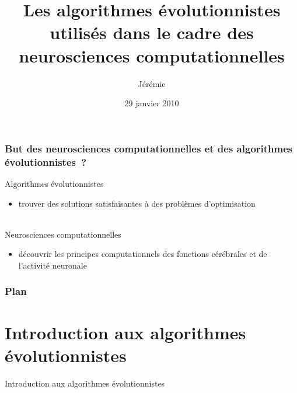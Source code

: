 \documentclass{beamer}
\title{Les algorithmes évolutionnistes utilisés dans le cadre des neurosciences computationnelles}
\author{Jérémie \bsc{Decock}}
\institute{UPMC}
\date{29 janvier 2010}
\begin{document}
\begin{frame}
\titlepage
\end{frame}


\begin{frame}
\frametitle{But des neurosciences computationnelles et des algorithmes évolutionnistes~?}
Algorithmes évolutionnistes
\begin{itemize}
	\item trouver des solutions satisfaisantes à des problèmes d'optimisation
\end{itemize}
~\\
Neurosciences computationnelles
\begin{itemize}
	\item découvrir les principes computationnels des fonctions cérébrales et de l'activité neuronale
\end{itemize}
\end{frame}


\begin{frame}
\frametitle{Plan}
\tableofcontents[sectionstyle=show/show,subsectionstyle=hide/hide/hide]
\end{frame}


\section{Introduction aux algorithmes évolutionnistes}
\begin{frame}
\begin{center}
{\LARGE Introduction aux algorithmes évolutionnistes}
\end{center}
\end{frame}
\end{document}
